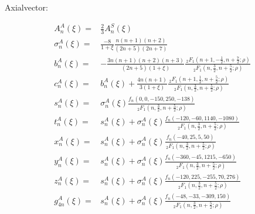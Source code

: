 \documentclass[aps,prc,superscriptaddress,showpacs,floatfix, nofootinbib,preprintnumbers,twocolumn]{revtex4}
\begin{document}
Axialvector:
\begin{scriptsize}
\begin{align}
A^A_n(\xi)=&\frac{2}{3}A^S_n(\xi)\\
\sigma^A_n(\xi)=&\frac{-8}{1+\xi}\frac{n(n+1)(n+2)}{(2n+5)(2n+7)}\\
b^A_n(\xi)=&-\frac{3n(n+1)(n+2)(n+3)}{(2n+5)(1+\xi)}\frac{\,_2F_1(n+1,-\frac{1}{2},n+\frac{7}{2};\rho)}{\,_2F_1(n,\frac{3}{2},n+\frac{5}{2};\rho)}\\
c^A_n(\xi)=&b^A_n(\xi)+\frac{4n(n+1)}{3(1+\xi)}\frac{\,_2F_1(n+1,\frac{1}{2},n+\frac{5}{2};\rho)}{\,_2F_1(n,\frac{3}{2},n+\frac{5}{2};\rho)}\\
s^A_n(\xi)=&\sigma^A_n(\xi)\frac{f_n(0,0,-150,250,-138)}{\,_2F_1(n,\frac{3}{2},n+\frac{5}{2};\rho)}\\
t^A_n(\xi)=&s^A_n(\xi)+\sigma^A_n(\xi)\frac{f_n(-120,-60,1140,-1080)}{\,_2F_1(n,\frac{3}{2},n+\frac{5}{2};\rho)}\\
x^A_n(\xi)=&s^A_n(\xi)+\sigma^A_n(\xi)\frac{f_n(-40,25,5,50)}{\,_2F_1(n,\frac{3}{2},n+\frac{5}{2};\rho)}\\
y^A_n(\xi)=&s^A_n(\xi)+\sigma^A_n(\xi)\frac{f_n(-360,-45,1215,-650)}{\,_2F_1(n,\frac{3}{2},n+\frac{5}{2};\rho)}\\
z^A_n(\xi)=&s^A_n(\xi)+\sigma^A_n(\xi)\frac{f_n(-120,225,-255,70,276)}{\,_2F_1(n,\frac{3}{2},n+\frac{5}{2};\rho)}\\
g^A_{4n}(\xi)=&s^A_n(\xi)+\sigma^A_n(\xi)\frac{f_n(-48,-33,-309,150)}{\,_2F_1(n,\frac{3}{2},n+\frac{5}{2};\rho)}
\end{align}
\end{scriptsize}
\end{document}
